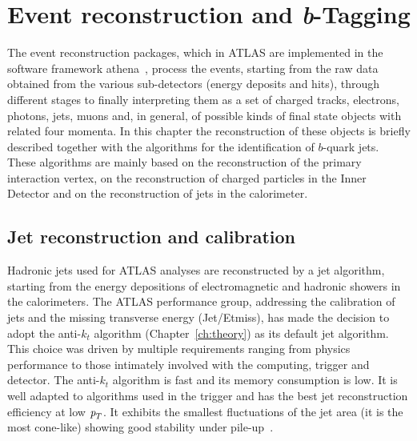 %
%

\chapter{Event reconstruction and \emph{\textbf{b}}-Tagging }\label{ch:reco}


The event reconstruction packages, which in ATLAS are implemented in the software framework {\sc athena}~\cite{Calafiura2005zz}, process the events, starting from the raw data obtained from the various sub-detectors (energy deposits and hits),  %
through different stages to finally interpreting them as a set of charged tracks, electrons, photons, jets, muons and, in general, of possible kinds of final state objects with related four momenta.  
In this chapter the reconstruction of these objects is briefly described together with the algorithms for the identification of $b$-quark jets.  These algorithms are mainly based on the reconstruction of the primary interaction vertex, on the reconstruction of charged particles in the Inner Detector and on the reconstruction of jets in the calorimeter.   

\section{Jet reconstruction and calibration}\label{sec:ObjSelection}

Hadronic jets used for ATLAS analyses are reconstructed by a jet algorithm, starting from the energy depositions of electromagnetic and hadronic showers in the calorimeters. 
The ATLAS performance group, addressing the calibration of jets and the missing transverse energy (Jet/Etmiss), has made the decision to adopt the anti-$k_t$ algorithm (Chapter~\ref{ch:theory}) as its default jet algorithm. This choice was driven by multiple requirements ranging from physics performance to those intimately involved with the computing, trigger and detector.
The anti-$k_t$ algorithm is fast and its memory consumption is low. It is well adapted to algorithms used in the trigger and has the best jet reconstruction efficiency at low ${\emph{p}_{T}}$. It exhibits the smallest fluctuations of the jet area (it is the most cone-like) showing good stability under pile-up~\cite{Asquith:1311867}.

